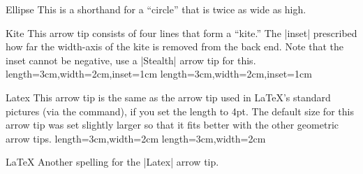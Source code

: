 \begin{arrowtipsimple}{Ellipse}
  This is a shorthand for a ``circle'' that is twice as wide as high.
  
  \begin{arrowexamples}
    \arrowexample[]
    \arrowexampledup[sep]
    \arrowexampledupdot[sep]
    \arrowexample[open]
    \arrowexample[length=10pt]
    \arrowexample[round]
    \arrowexample[slant=.3]
    \arrowexample[left]
    \arrowexample[right]
    \arrowexample[red]
    \arrowexample[fill=red!50]
  \end{arrowexamples}
\end{arrowtipsimple}


\begin{arrowtip}{Kite}
  {
    This arrow tip consists of four lines that form a ``kite.'' The
    |inset| prescribed how far the width-axis of the kite is removed
    from the back end. Note that the inset cannot be negative, use a
    |Stealth| arrow tip for this.
  }
  {length=3cm,width=2cm,inset=1cm}
  {length=3cm,width=2cm,inset=1cm}
  
  \begin{arrowexamples}
    \arrowexample[]
    \arrowexampledup[sep]
    \arrowexampledupdot[sep]
    \arrowexample[open]
    \arrowexample[length=6pt,width=4pt]
    \arrowexample[length=6pt,width=4pt,inset=1.5pt]
    \arrowexample[round]
    \arrowexample[slant=.3]
    \arrowexample[left]
    \arrowexample[right]
    \arrowexample[red]
  \end{arrowexamples}
\end{arrowtip}


\begin{arrowtip}{Latex}
  {
    This arrow tip is the same as the arrow tip used in \LaTeX's
    standard pictures (via the \texttt{\string\vec} command), if you
    set the length to 4pt. The default size for this arrow tip was set
    slightly larger so that it fits better with the other geometric
    arrow tips. 
  }
  {length=3cm,width=2cm}
  {length=3cm,width=2cm}
  
  \begin{arrowexamples}
    \arrowexample[]
    \arrowexampledup[sep]
    \arrowexampledupdot[sep]
    \arrowexample[open]
    \arrowexample[length=4pt]
    \arrowexample[round]
    \arrowexample[slant=.3]
    \arrowexample[left]
    \arrowexample[right]
    \arrowexample[red]
  \end{arrowexamples}
\end{arrowtip}

\begin{arrowtipsimple}{LaTeX}
  Another spelling for the |Latex| arrow tip.
\end{arrowtipsimple}



